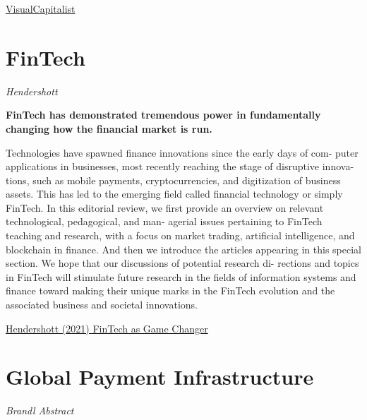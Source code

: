\documentclass[
]{book}
\begin{document}
\href{https://www.visualcapitalist.com/visualizing-the-sustainable-etf-universe/}{VisualCapitalist}

\hypertarget{fintech}{%
\chapter{FinTech}\label{fintech}}

\emph{Hendershott}

\textbf{FinTech has demonstrated tremendous power in fundamentally changing
how the financial market is run.}

Technologies have spawned finance innovations since the early days of com-
puter applications in businesses, most recently reaching the stage of disruptive innova-
tions, such as mobile payments, cryptocurrencies, and digitization of business assets. This
has led to the emerging field called financial technology or simply FinTech. In this editorial
review, we first provide an overview on relevant technological, pedagogical, and man-
agerial issues pertaining to FinTech teaching and research, with a focus on market trading,
artificial intelligence, and blockchain in finance. And then we introduce the articles
appearing in this special section. We hope that our discussions of potential research di-
rections and topics in FinTech will stimulate future research in the fields of information
systems and finance toward making their unique marks in the FinTech evolution and the
associated business and societal innovations.

\href{pdf/Hendershott_2021_FinTech_as_Game_Changer.pdf}{Hendershott (2021) FinTech as Game Changer}

\hypertarget{global-payment-infrastructure}{%
\chapter{Global Payment Infrastructure}\label{global-payment-infrastructure}}

\emph{Brandl Abstract}
\end{document}
